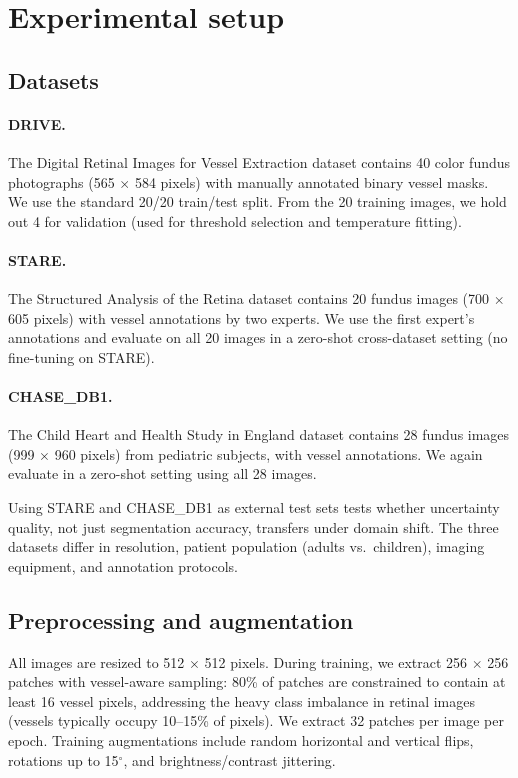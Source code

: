\section{Experimental setup}
\label{sec:experimental_setup}

\subsection{Datasets}

\paragraph{DRIVE.} The Digital Retinal Images for Vessel Extraction dataset
\citep{staal2004drive} contains 40 color fundus photographs (565 $\times$ 584
pixels) with manually annotated binary vessel masks. We use the standard
20/20 train/test split. From the 20 training images, we hold out 4 for
validation (used for threshold selection and temperature fitting).

\paragraph{STARE.} The Structured Analysis of the Retina dataset
\citep{hoover2000stare} contains 20 fundus images (700 $\times$ 605 pixels)
with vessel annotations by two experts. We use the first expert's annotations
and evaluate on all 20 images in a zero-shot cross-dataset setting (no
fine-tuning on STARE).

\paragraph{CHASE\_DB1.} The Child Heart and Health Study in England dataset
\citep{fraz2012chase} contains 28 fundus images (999 $\times$ 960 pixels)
from pediatric subjects, with vessel annotations. We again evaluate in a
zero-shot setting using all 28 images.

Using STARE and CHASE\_DB1 as external test sets tests whether uncertainty
quality, not just segmentation accuracy, transfers under domain shift. The
three datasets differ in resolution, patient population (adults vs.\ children),
imaging equipment, and annotation protocols.

\subsection{Preprocessing and augmentation}

All images are resized to 512 $\times$ 512 pixels. During training, we
extract 256 $\times$ 256 patches with vessel-aware sampling: 80\% of patches
are constrained to contain at least 16 vessel pixels, addressing the heavy
class imbalance in retinal images (vessels typically occupy 10--15\% of pixels).
We extract 32 patches per image per epoch. Training augmentations include
random horizontal and vertical flips, rotations up to 15$^\circ$, and
brightness/contrast jittering.


